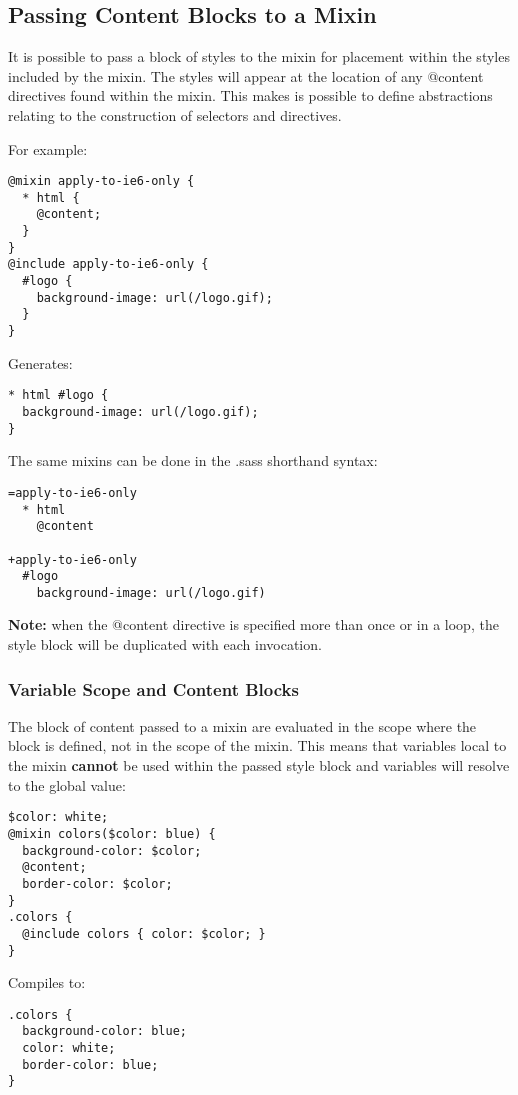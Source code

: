 \documentclass[10pt]{article}
\begin{document}
\subsection{Passing Content Blocks to a Mixin}


 It is possible to pass a block of styles to the mixin for placement within the styles included by the mixin. The styles will appear at the location of any @content directives found within the mixin. This makes is possible to define abstractions relating to the construction of selectors and directives.


 For example:
\begin{verbatim}
@mixin apply-to-ie6-only {
  * html {
    @content;
  }
}
@include apply-to-ie6-only {
  #logo {
    background-image: url(/logo.gif);
  }
}
\end{verbatim}


 Generates:
\begin{verbatim}
* html #logo {
  background-image: url(/logo.gif);
}
\end{verbatim}


 The same mixins can be done in the .sass shorthand syntax:
\begin{verbatim}
=apply-to-ie6-only
  * html
    @content

+apply-to-ie6-only
  #logo
    background-image: url(/logo.gif)
\end{verbatim}


 \textbf{Note:}
 when the @content directive is specified more than once or in a loop, the style block will be duplicated with each invocation.
\subsubsection{Variable Scope and Content Blocks}


 The block of content passed to a mixin are evaluated in the scope where the block is defined, not in the scope of the mixin. This means that variables local to the mixin \textbf{cannot}
 be used within the passed style block and variables will resolve to the global value:
\begin{verbatim}
$color: white;
@mixin colors($color: blue) {
  background-color: $color;
  @content;
  border-color: $color;
}
.colors {
  @include colors { color: $color; }
}
\end{verbatim}


 Compiles to:
\begin{verbatim}
.colors {
  background-color: blue;
  color: white;
  border-color: blue;
}
\end{verbatim}
\end{document}
